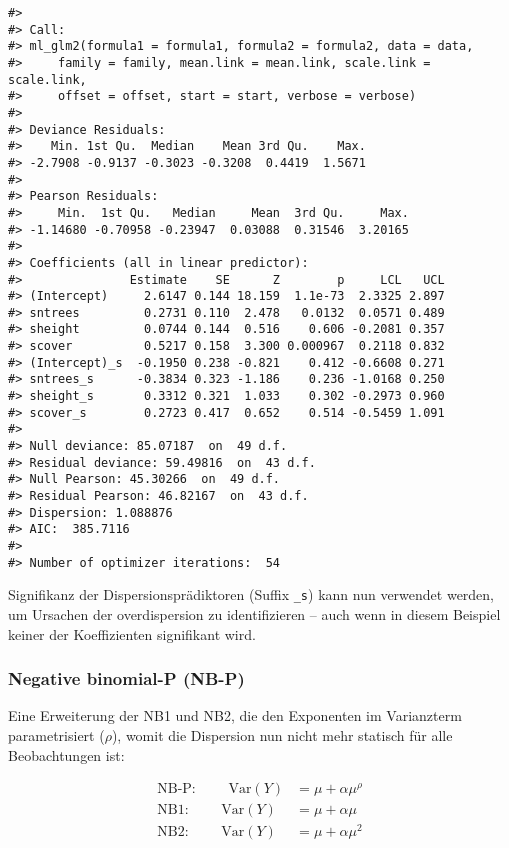 \documentclass[ngerman,a4paper,]{scrartcl}
\theoremstyle{definition}
\theoremstyle{definition}
\theoremstyle{definition}
\theoremstyle{remark}
\let\BeginKnitrBlock\begin \let\EndKnitrBlock\end
\begin{document}
\begin{verbatim}
#> 
#> Call:
#> ml_glm2(formula1 = formula1, formula2 = formula2, data = data, 
#>     family = family, mean.link = mean.link, scale.link = scale.link, 
#>     offset = offset, start = start, verbose = verbose)
#> 
#> Deviance Residuals:
#>    Min. 1st Qu.  Median    Mean 3rd Qu.    Max. 
#> -2.7908 -0.9137 -0.3023 -0.3208  0.4419  1.5671 
#> 
#> Pearson Residuals:
#>     Min.  1st Qu.   Median     Mean  3rd Qu.     Max. 
#> -1.14680 -0.70958 -0.23947  0.03088  0.31546  3.20165 
#> 
#> Coefficients (all in linear predictor):
#>               Estimate    SE      Z        p     LCL   UCL
#> (Intercept)     2.6147 0.144 18.159  1.1e-73  2.3325 2.897
#> sntrees         0.2731 0.110  2.478   0.0132  0.0571 0.489
#> sheight         0.0744 0.144  0.516    0.606 -0.2081 0.357
#> scover          0.5217 0.158  3.300 0.000967  0.2118 0.832
#> (Intercept)_s  -0.1950 0.238 -0.821    0.412 -0.6608 0.271
#> sntrees_s      -0.3834 0.323 -1.186    0.236 -1.0168 0.250
#> sheight_s       0.3312 0.321  1.033    0.302 -0.2973 0.960
#> scover_s        0.2723 0.417  0.652    0.514 -0.5459 1.091
#> 
#> Null deviance: 85.07187  on  49 d.f.
#> Residual deviance: 59.49816  on  43 d.f.
#> Null Pearson: 45.30266  on  49 d.f.
#> Residual Pearson: 46.82167  on  43 d.f.
#> Dispersion: 1.088876
#> AIC:  385.7116
#> 
#> Number of optimizer iterations:  54
\end{verbatim}

Signifikanz der Dispersionsprädiktoren (Suffix \texttt{\_s}) kann nun verwendet werden, um Ursachen der overdispersion zu identifizieren -- auch wenn in diesem Beispiel keiner der Koeffizienten signifikant wird.

\hypertarget{mod-nbp}{%
\subsubsection{Negative binomial-P (NB-P)}\label{mod-nbp}}

Eine Erweiterung der NB1 und NB2, die den Exponenten im Varianzterm parametrisiert (\(\rho\)), womit die Dispersion nun nicht mehr statisch für alle Beobachtungen ist:

\BeginKnitrBlock{definition}[NB-P]
\protect\hypertarget{def:defnbp}{}{\label{def:defnbp} \iffalse (NB-P) \fi{} }\begin{align*}
  \text{NB-P: }\qquad \mathrm{Var}(Y) &= \mu + \alpha\mu^\rho \\
  \text{NB1: } \qquad \mathrm{Var}(Y) &= \mu + \alpha\mu      \\
  \text{NB2: } \qquad \mathrm{Var}(Y) &= \mu + \alpha\mu^2
\end{align*}
\EndKnitrBlock{definition}
\end{document}
